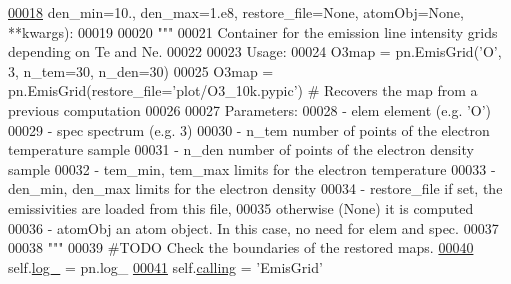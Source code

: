 \begin{DoxyCode}
\hypertarget{classpyneb_1_1core_1_1emis_grid_1_1_emis_grid_l00018}{}\hyperlink{classpyneb_1_1core_1_1emis_grid_1_1_emis_grid_a39c57fa6ec1619540d588cded7bbce9c}{00018}                  den\_min=10., den\_max=1.e8, restore\_file=\textcolor{keywordtype}{None}, atomObj=\textcolor{keywordtype}{None}, **kwargs):
00019 
00020         \textcolor{stringliteral}{"""}
00021 \textcolor{stringliteral}{        Container for the emission line intensity grids depending on Te and Ne.}
00022 \textcolor{stringliteral}{}
00023 \textcolor{stringliteral}{        Usage:}
00024 \textcolor{stringliteral}{            O3map = pn.EmisGrid('O', 3, n\_tem=30, n\_den=30)}
00025 \textcolor{stringliteral}{            O3map = pn.EmisGrid(restore\_file='plot/O3\_10k.pypic') # Recovers the map from a previous
       computation}
00026 \textcolor{stringliteral}{}
00027 \textcolor{stringliteral}{        Parameters:}
00028 \textcolor{stringliteral}{            - elem               element (e.g. 'O')}
00029 \textcolor{stringliteral}{            - spec               spectrum (e.g. 3)}
00030 \textcolor{stringliteral}{            - n\_tem              number of points of the electron temperature sample}
00031 \textcolor{stringliteral}{            - n\_den              number of points of the electron density sample}
00032 \textcolor{stringliteral}{            - tem\_min, tem\_max   limits for the electron temperature}
00033 \textcolor{stringliteral}{            - den\_min, den\_max   limits for the electron density}
00034 \textcolor{stringliteral}{            - restore\_file       if set, the emissivities are loaded from this file, }
00035 \textcolor{stringliteral}{                                 otherwise (None) it is computed}
00036 \textcolor{stringliteral}{            - atomObj            an atom object. In this case, no need for elem and spec.}
00037 \textcolor{stringliteral}{}
00038 \textcolor{stringliteral}{        """}
00039         \textcolor{comment}{#TODO Check the boundaries of the restored maps.}
\hypertarget{classpyneb_1_1core_1_1emis_grid_1_1_emis_grid_l00040}{}\hyperlink{classpyneb_1_1core_1_1emis_grid_1_1_emis_grid_a1a53003d1e4a12bbc4ff9233a3fcd54a}{00040}         self.\hyperlink{classpyneb_1_1core_1_1emis_grid_1_1_emis_grid_a1a53003d1e4a12bbc4ff9233a3fcd54a}{log\_} = pn.log\_
\hypertarget{classpyneb_1_1core_1_1emis_grid_1_1_emis_grid_l00041}{}\hyperlink{classpyneb_1_1core_1_1emis_grid_1_1_emis_grid_a19820878261ee98513e0b755e688453f}{00041}         self.\hyperlink{classpyneb_1_1core_1_1emis_grid_1_1_emis_grid_a19820878261ee98513e0b755e688453f}{calling} = \textcolor{stringliteral}{'EmisGrid'}

\end{DoxyCode}
